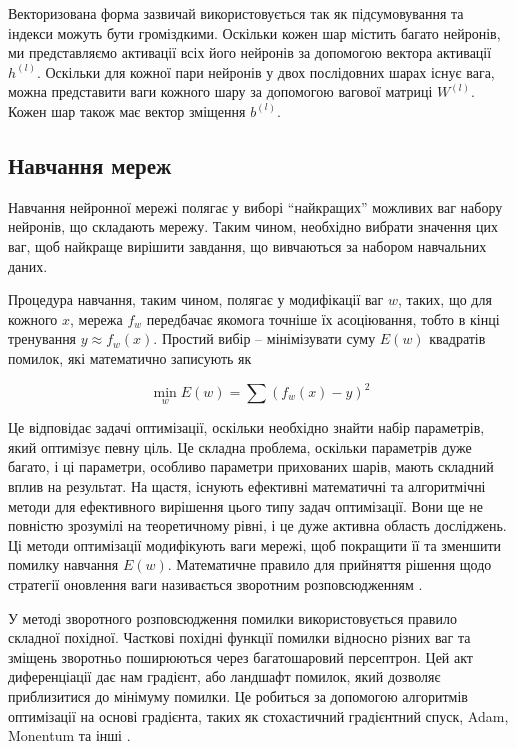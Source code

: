 Векторизована форма зазвичай використовується так як підсумовування
та індекси можуть бути громіздкими. Оскільки кожен шар містить
багато нейронів, ми представляємо активації всіх його нейронів
за допомогою вектора активації $h^{(l)}$. Оскільки для кожної пари
нейронів у двох послідовних шарах існує вага, можна представити
ваги кожного шару за допомогою вагової матриці $W^{(l)}$. Кожен шар також має вектор зміщення $b^{(l)}$.

\subsection{Навчання мереж}
Навчання нейронної мережі полягає у виборі ``найкращих'' можливих
ваг набору нейронів, що складають мережу. Таким чином,
необхідно вибрати значення цих ваг, щоб найкраще вирішити
завдання, що вивчаються за набором навчальних даних.

Процедура навчання, таким чином, полягає у модифікації ваг $w$,
таких, що для кожного $x$, мережа $f_w$ передбачає якомога
точніше їх асоціювання, тобто в кінці тренування $y \approx f_w(x)$.
Простий вибір -- мінімізувати суму $E(w)$ квадратів
помилок, які математично записують як

\begin{equation}
    \min_w E(w) = \sum (f_w(x) - y)^2
\end{equation}

Це відповідає задачі оптимізації, оскільки необхідно знайти
набір параметрів, який оптимізує певну ціль.
Це складна проблема, оскільки параметрів дуже багато, і ці
параметри, особливо параметри прихованих шарів, мають складний
вплив на результат. На щастя, існують ефективні математичні та
алгоритмічні методи для ефективного вирішення цього типу задач
оптимізації. Вони ще не повністю зрозумілі на теоретичному
рівні, і це дуже активна область досліджень. Ці методи
оптимізації модифікують ваги мережі, щоб покращити її та
зменшити помилку навчання $E(w)$. Математичне
правило для прийняття рішення щодо стратегії оновлення
ваги називається зворотним розповсюдженням \cite{nn:backpropagation}.

У методі зворотного розповсюдження помилки
використовується правило складної похідної.
Часткові похідні функції помилки відносно різних ваг та зміщень
зворотньо поширюються через багатошаровий персептрон.
Цей акт диференціації дає нам градієнт, або ландшафт помилок,
який дозволяє приблизитися до мінімуму помилки. Це робиться
за допомогою алгоритмів оптимізації на основі градієнта, таких
як стохастичний градієнтний спуск, Adam, Monentum та інші
\cite{gradient-descend}.

